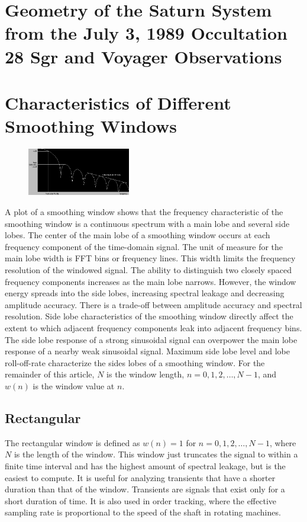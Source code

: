 \documentclass[oneside]{book}
\theoremstyle{mystyle}
\begin{document}
\section{Geometry of the Saturn System from the July 3, 1989 Occultation 28 Sgr and Voyager Observations}
\section{Characteristics of Different Smoothing Windows}
\begin{figure}
	\begin{center}
	\includegraphics[width = 0.4\textwidth]{CDSW_1}
	\end{center}
\end{figure}
\noindent A plot of a smoothing window shows that the frequency characteristic of the smoothing window is a continuous spectrum with a main lobe and several side lobes. The center of the main lobe of a smoothing window occurs at each frequency component of the time-domain signal. The unit of measure for the main lobe width is FFT bins or frequency lines. This width limits the frequency resolution of the windowed signal. The ability to distinguish two closely spaced frequency components increases as the main lobe narrows. However, the window energy spreads into the side lobes, increasing spectral leakage and decreasing amplitude accuracy. There is a trade-off between amplitude accuracy and spectral resolution. Side lobe characteristics of the smoothing window directly affect the extent to which adjacent frequency components leak into adjacent frequency bins. The side lobe response of a strong sinusoidal signal can overpower the main lobe response of a nearby weak sinusoidal signal. Maximum side lobe level and lobe roll-off-rate characterize the sides lobes of a smoothing window. For the remainder of this article, $N$ is the window length, $n=0,1,2,\hdots, N-1$, and $w(n)$ is the window value at $n$.
\subsection{Rectangular}
\noindent The rectangular window is defined as $w(n) = 1$ for $n=0,1,2,\hdots, N-1$, where $N$ is the length of the window. This window just truncates the signal to within a finite time interval and has the highest amount of spectral leakage, but is the easiest to compute. It is useful for analyzing transients that have a shorter duration than that of the window. Transients are signals that exist only for a short duration of time. It is also used in order tracking, where the effective sampling rate is proportional to the speed of the shaft in rotating machines. 
\end{document}
